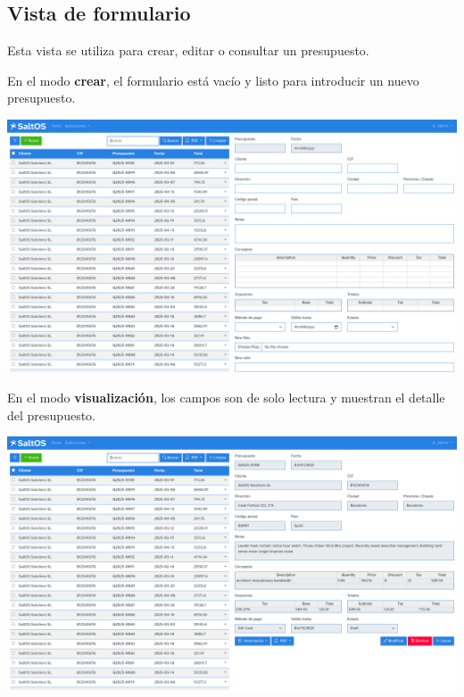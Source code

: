 \documentclass[a4paper]{article}
\begin{document}
\hypertarget{toc74}{}
\subsection{Vista de formulario}

Esta vista se utiliza para crear, editar o consultar un presupuesto.

En el modo \textbf{crear}, el formulario está vacío y listo para introducir un nuevo presupuesto.

\begin{center}\includegraphics[width=1\textwidth]{../ujest/snaps/test-screenshots-js-screenshots-crm-quotes-create-es-es-1-snap.png}\end{center}

En el modo \textbf{visualización}, los campos son de solo lectura y muestran el detalle del presupuesto.

\begin{center}\includegraphics[width=1\textwidth]{../ujest/snaps/test-screenshots-js-screenshots-crm-quotes-view-100-es-es-1-snap.png}\end{center}
\end{document}
